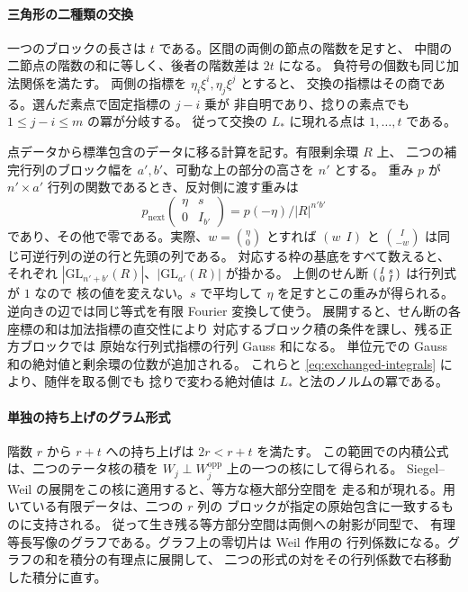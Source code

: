 \paragraph{三角形の二種類の交換}
一つのブロックの長さは \(t\) である。区間の両側の節点の階数を足すと、
中間の二節点の階数の和に等しく、後者の階数差は \(2t\) になる。
負符号の個数も同じ加法関係を満たす。
両側の指標を \(\eta_i\xi^i,\eta_j\xi^j\) とすると、
交換の指標はその商である。選んだ素点で固定指標の \(j-i\) 乗が
非自明であり、捻りの素点でも \(1\le j-i\le m\) の冪が分岐する。
従って交換の \(L_*\) に現れる点は \(1,\ldots,t\) である。

点データから標準包含のデータに移る計算を記す。有限剰余環 \(R\) 上、
二つの補完行列のブロック幅を \(a',b'\)、可動な上の部分の高さを \(n'\) とする。
重み \(p\) が \(n'\times a'\) 行列の関数であるとき、反対側に渡す重みは
\[
 p_\mathrm{next}\begin{pmatrix}\eta&s\\0&I_{b'}\end{pmatrix}
     =p(-\eta)/|R|^{n'b'}
\]
であり、その他で零である。実際、\(w=\binom{\eta}{0}\) とすれば
\((w\ \ I)\) と \(\binom{I}{-w}\) は同じ可逆行列の逆の行と先頭の列である。
対応する枠の基底をすべて数えると、それぞれ
\(|\mathrm{GL}_{n'+b'}(R)|\)、\(|\mathrm{GL}_{a'}(R)|\) が掛かる。
上側のせん断 \(\begin{psmallmatrix}I&s\\0&I\end{psmallmatrix}\) は行列式が \(1\) なので
核の値を変えない。\(s\) で平均して \(\eta\) を足すとこの重みが得られる。
逆向きの辺では同じ等式を有限 Fourier 変換して使う。
展開すると、せん断の各座標の和は加法指標の直交性により
対応するブロック積の条件を課し、残る正方ブロックでは
原始な行列式指標の行列 Gauss 和になる。
単位元での Gauss 和の絶対値と剰余環の位数が追加される。
これらと \eqref{eq:exchanged-integrals} により、随伴を取る側でも
捻りで変わる絶対値は \(L_*\) と法のノルムの冪である。

\paragraph{単独の持ち上げのグラム形式}
階数 \(r\) から \(r+t\) への持ち上げは \(2r<r+t\) を満たす。
この範囲での内積公式は、二つのテータ核の積を
\(W_j\perp W_j^{\mathrm{opp}}\) 上の一つの核にして得られる。
Siegel--Weil の展開をこの核に適用すると、等方な極大部分空間を
走る和が現れる。用いている有限データは、二つの \(r\) 列の
ブロックが指定の原始包含に一致するものに支持される。
従って生き残る等方部分空間は両側への射影が同型で、
有理等長写像のグラフである。グラフ上の零切片は Weil 作用の
行列係数になる。グラフの和を積分の有理点に展開して、
二つの形式の対をその行列係数で右移動した積分に直す。

